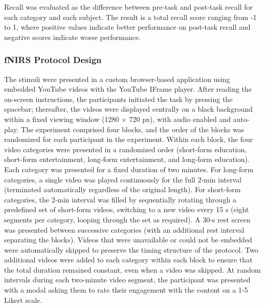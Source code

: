 \documentclass[10pt, twocolumn]{article}
\begin{document}
Recall was evaluated as the difference between pre-task and post-task recall for each category and each subject. The result is a total recall score ranging from -1 to 1, where positive values indicate better performance on post-task recall and negative scores indicate worse performance.


\subsubsection{fNIRS Protocol Design}
\label{section:fnirs_protocol}
The stimuli were presented in a custom browser-based application using embedded YouTube videos with the YouTube IFrame player. After reading the on-screen instructions, the participants initiated the task by pressing the spacebar; thereafter, the videos were displayed centrally on a black background within a fixed viewing window (1280 × 720 px), with audio enabled and auto-play. The experiment comprised four blocks, and the order of the blocks was randomized for each participant in the experiment. Within each block, the four video categories were presented in a randomized order (short-form education, short-form entertainment, long-form entertainment, and long-form education). Each category was presented for a fixed duration of two minutes. For long-form categories, a single video was played continuously for the full 2-min interval (terminated automatically regardless of the original length). For short-form categories, the 2-min interval was filled by sequentially rotating through a predefined set of short-form videos, switching to a new video every 15 s (eight segments per category, looping through the set as required). A 30-s rest screen was presented between successive categories (with an additional rest interval separating the blocks). Videos that were unavailable or could not be embedded were automatically skipped to preserve the timing structure of the protocol. Two additional videos were added to each category within each block to ensure that the total duration remained constant, even when a video was skipped. At random intervals during each two-minute video segment, the participant was presented with a modal asking them to rate their engagement with the content on a 1-5 Likert scale.
\end{document}
